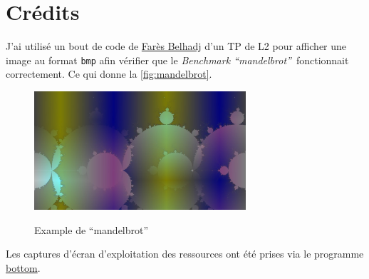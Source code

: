 \documentclass[a4paper]{article}
\def\mandel{\enquote{mandelbrot}}
\def\btwo{\textit{Benchmark \mandel}}
\begin{document}
\clearpage
\appendix
\section{Crédits}

J'ai utilisé un bout de code de \href{https://expreg.org/amsi/C/}{Farès Belhadj}
d'un TP de L2 pour afficher une image au format \texttt{bmp} afin vérifier que
le \btwo~fonctionnait correctement. Ce qui donne la \autoref{fig:mandelbrot}.

\begin{figure}[H]
  \centering
  \includegraphics[alt={Fractale \mandel},width=0.7\textwidth]{imgs/mandelbrot.jpg}
  \caption{Example de \mandel}
  \label{fig:mandelbrot}
\end{figure}

Les captures d'écran d'exploitation des ressources ont été prises via le
programme \href{https://github.com/ClementTsang/bottom}{bottom}.
\end{document}
